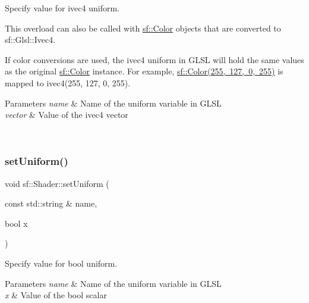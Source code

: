Specify value for {\ttfamily ivec4} uniform. 

This overload can also be called with \mbox{\hyperlink{classsf_1_1_color}{sf\+::\+Color}} objects that are converted to sf\+::\+Glsl\+::\+Ivec4.

If color conversions are used, the ivec4 uniform in G\+L\+SL will hold the same values as the original \mbox{\hyperlink{classsf_1_1_color}{sf\+::\+Color}} instance. For example, \mbox{\hyperlink{classsf_1_1_color}{sf\+::\+Color(255, 127, 0, 255)}} is mapped to ivec4(255, 127, 0, 255).


\begin{DoxyParams}{Parameters}
{\em name} & Name of the uniform variable in G\+L\+SL \\
\hline
{\em vector} & Value of the ivec4 vector \begin{DoxyVerb}\end{DoxyVerb}
 \\
\hline
\end{DoxyParams}
\mbox{\label{classsf_1_1_shader_af417027ac72c06e6cfbf30975cd678e9}} 
\subsubsection{\texorpdfstring{setUniform()}{setUniform()}\hspace{0.1cm}{\footnotesize\ttfamily [9/16]}}
{\footnotesize\ttfamily void sf\+::\+Shader\+::set\+Uniform (\begin{DoxyParamCaption}\item[{const std\+::string \&}]{name,  }\item[{bool}]{x }\end{DoxyParamCaption})}



Specify value for {\ttfamily bool} uniform. 


\begin{DoxyParams}{Parameters}
{\em name} & Name of the uniform variable in G\+L\+SL \\
\hline
{\em x} & Value of the bool scalar \begin{DoxyVerb}\end{DoxyVerb}
 \\
\hline
\end{DoxyParams}
\mbox{\label{classsf_1_1_shader_ab2518b8dd0762e682b452a5d5005f2bf}} 
